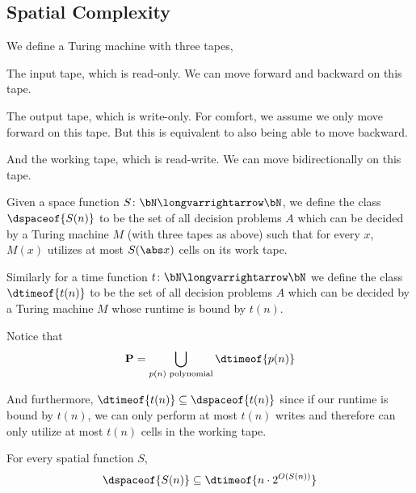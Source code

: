 \documentclass[10pt]{article}
\let\longto=\longvarrightarrow
\def\P{\mathbf{P}}
\begin{document}


\bigskip

\subsection{Spatial Complexity}

\begin{defn*}

    We define a Turing machine with three tapes,
    \benum
        \item The input tape, which is read-only.
        We can move forward and backward on this tape.
        \item The output tape, which is write-only.
        For comfort, we assume we only move forward on this tape.
        But this is equivalent to also being able to move backward.
        \item And the working tape, which is read-write.
        We can move bidirectionally on this tape.
    \eenum

    Given a space function $S\colon\bN\longto\bN$, we define the class $\dspaceof{S(n)}$ to be the set of all decision problems $A$ which can be decided by a Turing machine $M$ (with three tapes as above)
    such that for every $x$, $M(x)$ utilizes at most $S(\abs x)$ cells on its work tape.

    Similarly for a time function $t\colon\bN\longto\bN$ we define the class $\dtimeof{t(n)}$ to be the set of all decision problems $A$ which can be decided by a Turing machine $M$ whose runtime is bound
    by $t(n)$.

\end{defn*}

Notice that
\[ \P = \bigcup_{p(n)\text{ polynomial}}\dtimeof{p(n)} \]

And furthermore, $\dtimeof{t(n)}\subseteq\dspaceof{t(n)}$ since if our runtime is bound by $t(n)$, we can only perform at most $t(n)$ writes and therefore can only utilize at most $t(n)$ cells in the working
tape.

\begin{prop*}

    For every spatial function $S$,
    \[ \dspaceof{S(n)} \subseteq \dtimeof{n\cdot 2^{O(S(n))}} \]

\end{prop*}
\end{document}
